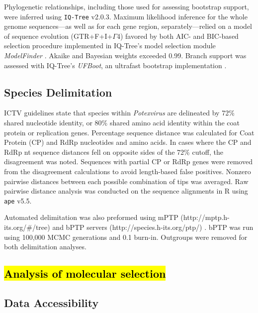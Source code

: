 \documentclass[fleqn,10pt,lineno]{wlpeerj}
\begin{document}
Phylogenetic relationships, including those used for assessing bootstrap support, were inferred using \texttt{IQ-Tree} v2.0.3. 
Maximum likelihood inference for the whole genome sequences---as well as for each gene region, separately---relied on a model of sequence evolution (GTR+F+I+$\Gamma$4) favored by both AIC- and BIC-based selection procedure implemented in IQ-Tree's model selection module {\em ModelFinder} \citep{kalyaanamoorthy2017}. 
Akaike and Bayesian weights exceeded 0.99. 
Branch support was assessed with IQ-Tree's {\em UFBoot}, an ultrafast bootstrap implementation \citep{hoang2018}.


\subsection*{Species Delimitation}
ICTV guidelines state that species within \textit{Potexvirus} are delineated by 72\% shared nucleotide identity, or 80\% shared amino acid identity within the coat protein or replication genes. 
Percentage sequence distance was calculated for Coat Protein (CP) and RdRp nucleotides and amino acids.
In cases where the CP and RdRp nt sequence distances fell on opposite sides of the 72\% cutoff, the disagreement was noted.
Sequences with partial CP or RdRp genes were removed from the disagreement calculations to avoid length-based false positives. 
Nonzero pairwise distances between each possible combination of tips was averaged. 
Raw pairwise distance analysis was conducted on the sequence alignments in R using \texttt{ape} v5.5.

Automated delimitation was also preformed using mPTP (http://mptp.h-its.org/\#/tree) \citep{Kapli_2017} and bPTP servers (http://species.h-its.org/ptp/) \citep{Zhang_2013}. 
bPTP was run using 100,000 MCMC generations and 0.1 burn-in. 
Outgroups were removed for both delimitation analyses.


\subsection*{\hl{Analysis of molecular selection}}


\subsection*{Data Accessibility}
\end{document}
